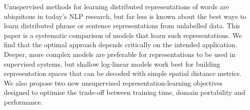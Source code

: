 Unuspervised methods for learning distributed representations of words are ubiquitous in today's NLP research, but far less is known about the best ways to learn distributed phrase or sentence representations from unlabelled data. This paper is a systematic comparison of models that learn such representations. We find that the optimal approach depends critically on the intended application. Deeper, more complex models are preferable for representations to be used in supervised systems, but shallow log-linear models work best for building representation spaces that can be decoded with simple spatial distance metrics. We also propose two new unsupervised representation-learning objectives designed to optimise the trade-off between training time, domain portability and performance.
